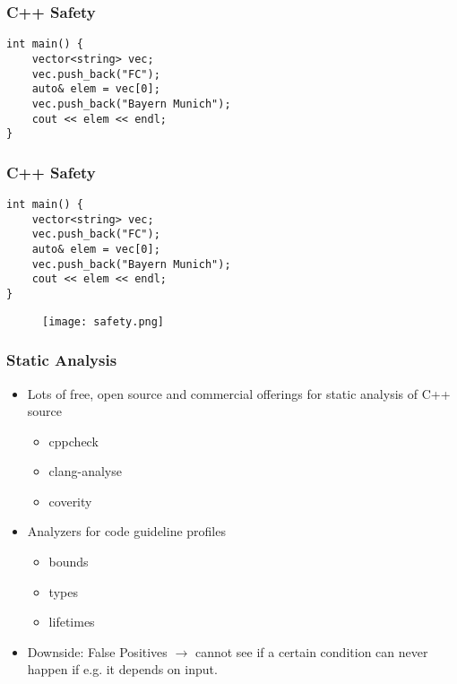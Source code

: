 \documentclass{beamer} %
\begin{document}
\begin{frame}[fragile]
\frametitle{C++ Safety}
\begin{lstlisting}
int main() {
    vector<string> vec;
    vec.push_back("FC");
    auto& elem = vec[0];
    vec.push_back("Bayern Munich");
    cout << elem << endl;
}
\end{lstlisting}

\end{frame}

\begin{frame}[fragile]
\frametitle{C++ Safety}
\begin{lstlisting}
int main() {
    vector<string> vec;
    vec.push_back("FC");
    auto& elem = vec[0];
    vec.push_back("Bayern Munich");
    cout << elem << endl;
}
\end{lstlisting}

\begin{figure}
\centering
\texttt{[image: safety.png]}
\end{figure}

\end{frame}

\begin{frame}
\frametitle{Static Analysis}

\begin{itemize}
    \item Lots of free, open source and commercial offerings for static analysis of C++ source
    \begin{itemize}
	\item cppcheck
	\item clang-analyse
	\item coverity
    \end{itemize}
\item Analyzers for code guideline profiles
    \begin{itemize}
	\item bounds
	\item types
	\item lifetimes
    \end{itemize}
\item Downside: False Positives $\rightarrow$ cannot see if a certain condition can never happen if e.g. it depends on input.
\end{itemize}

\end{frame}
\end{document}
